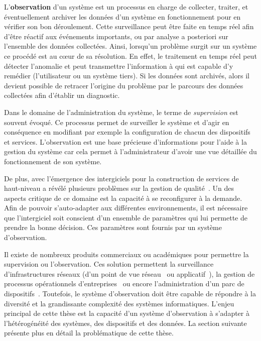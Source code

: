 L'\textbf{observation} d'un système est un processus en charge de collecter, traiter, et éventuellement archiver les données d'un système en fonctionnement pour en vérifier son bon déroulement. Cette surveillance peut être faite en temps réel afin d'être réactif aux événements importants, ou par analyse a posteriori sur l'ensemble des données collectées. Ainsi, lorsqu'un problème surgit sur un système ce procédé est au cœur de sa résolution. En effet, le traitement en temps réel peut détecter l'anomalie et peut transmettre l'information à qui est capable d'y remédier (l'utilisateur ou un système tiers). Si les données sont archivés, alors il devient possible de retracer l'origine du problème par le parcours des données collectées afin d'établir un diagnostic.

Dans le domaine de l'administration du système, le terme de \textit{supervision} est souvent évoqué. Ce processus permet de surveiller le système et d'agir en conséquence en modifiant par exemple la configuration de chacun des dispositifs et services. L'observation est une base précieuse d'informations pour l'aide à la gestion du système car cela permet à l'administrateur d'avoir une vue détaillée du fonctionnement de son système.

De plus, avec l'émergence des intergiciels pour la construction de services de haut-niveau a révélé plusieurs problèmes sur la gestion de qualité~\cite{Geihs:challenges}. Un des aspects critique de ce domaine est la capacité à se reconfigurer à la demande. Afin de pouvoir s'auto-adapter aux différentes environnements, il est nécessaire que l'intergiciel soit conscient d'un ensemble de paramètres qui lui permette de prendre la bonne décision. Ces paramètres sont fournis par un système d'observation.

Il existe de nombreux produits commerciaux ou académiques pour permettre la supervision ou l'observation. Ces solution permettent la surveillance d'infrastructures réseaux (d'un point de vue réseau~\cite{url:zabbix} ou applicatif~\cite{url:manageengine}), la gestion de processus opérationnels d'entreprises~\cite{url:systar} ou encore l'administration d'un parc de dispositifs~\cite{IETF:SNMP}. Toutefois, le système d'observation doit être capable de répondre à la diversité et la grandissante complexité des systèmes informatiques. L'enjeu principal de cette thèse est la capacité d'un système d'observation à s'adapter à l'hétérogénéité des systèmes, des dispositifs et des données. La section suivante présente plus en détail la problématique de cette thèse.